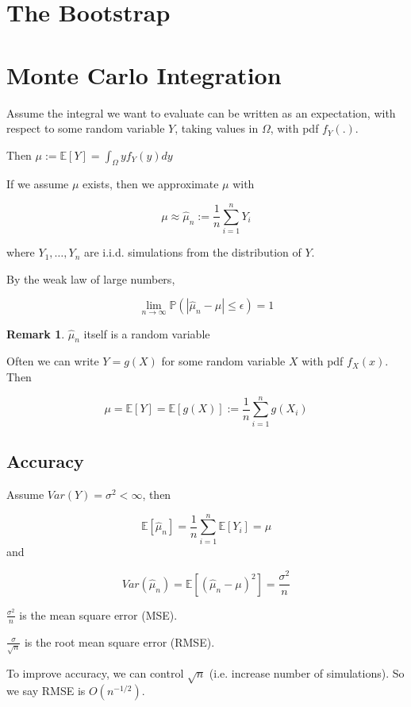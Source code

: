 \documentclass[12pt,a4paper]{article}
\theoremstyle{definition}
\newtheorem*{remark}{Remark}
\begin{document}
\section{The Bootstrap}



\section{Monte Carlo Integration}

Assume the integral we want to evaluate can be written as an expectation, with respect to some random variable $Y$, taking values in $\Omega$, with pdf $f_Y(.)$.

Then $\mu := \mathbb{E}[Y] = \int_{\Omega} y f_Y(y)dy$

If we assume $\mu$ exists, then we approximate $\mu$ with 

\[\mu \approx \hat{\mu}_n := \frac{1}{n} \sum_{i = 1}^{n} Y_i\]

where $Y_1, \dots, Y_n$ are i.i.d. simulations from the distribution of $Y$.

By the weak law of large numbers,

\[\lim_{n \rightarrow \infty} \mathbb{P}(|\hat{\mu}_n - \mu| \le \epsilon) = 1\]

\begin{remark}
	$\hat{\mu}_n$ itself is a random variable
\end{remark}

Often we can write $Y = g(X)$ for some random variable $X$ with pdf $f_X(x)$. Then

\[\mu = \mathbb{E}[Y] = \mathbb{E}[g(X)] := \frac{1}{n} \sum_{i = 1}^{n} g(X_i)\]

\subsection{Accuracy}

Assume $Var(Y) = \sigma^2 < \infty$, then

\[\mathbb{E}[\hat{\mu}_n] = \frac{1}{n} \sum_{i = 1}^{n} \mathbb{E}[Y_i] = \mu\] and 

\[Var(\hat{\mu}_n) = \mathbb{E}[{(\hat{\mu}_n - \mu)} ^ 2] = \frac{\sigma^2}{n}\]

$\frac{\sigma^2}{n}$ is the mean square error (MSE).

$\frac{\sigma}{\sqrt{n}}$ is the root mean square error (RMSE).

To improve accuracy, we can control $\sqrt{n}$ (i.e. increase number of simulations). So we say RMSE is $O(n^{-1 / 2})$.
\end{document}
